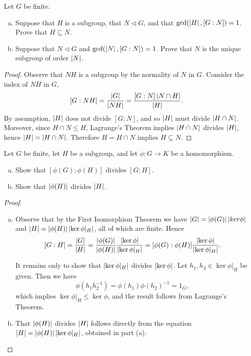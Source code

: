 \documentclass[10pt]{amsart}
\begin{document}
\begin{thm}
  Let $G$ be finite.
  \begin{enumerate}[(a)]
  \item
    Suppose that $H$ is a subgroup, that $N \lhd G$, and that $\gcd(\left| H \right|, [G:N]) = 1$.
    Prove that $H \subseteq N$.
  \item
    Suppose that $N \lhd G$ and $\gcd(\left| N \right|, [G:N]) = 1$.
    Prove that $N$ is the unique subgroup of order $\left| N \right|$.
  \end{enumerate}
  \begin{proof}
    Observe that $NH$ is a subgroup by the normality of $N$ in $G$.
    Consider the index of $NH$ in $G$, $$[G : NH] = \frac{\left| G \right|}{\left| NH \right|} = \frac{[G:N]\left| N \cap H \right|}{\left| H \right|}.$$
    By assumption, $\left| H \right|$ does not divide $[G:N]$, and so $\left| H \right|$ must divide $\left| H \cap N \right|$.
    Moreover, since $H \cap N \leq H$, Lagrange's Theorem implies $\left| H \cap N \right|$ divides $\left| H \right|$, hence $\left| H \right| = \left| H \cap N \right|$.
    Therefore $H = H \cap N$ implies $H \subseteq N$.
  \end{proof}
\end{thm}
\begin{thm}
  Let $G$ be finite, let $H$ be a subgroup, and let $\phi \colon G \rightarrow K$ be a homomorphism.
  \begin{enumerate}[(a)]
  \item
    Show that $[\phi(G) : \phi(H)]$ divides $[G : H]$.
  \item
    Show that $\left| \phi(H) \right|$ divides $\left| H \right|$.
  \end{enumerate}
  \begin{proof}
    \begin{enumerate}[(a)]
    \item
      Observe that by the First Isomorphism Theorem we have $\left| G \right| = \left| \phi(G) \right|\left| ker\phi \right|$ and $\left| H \right| = \left| \phi(H) \right|\left| \ker\phi|_H \right|$, all of which are finite.
      Hence $$[G : H] = \frac{\left| G \right|}{\left| H \right|} 
      = \frac{\left| \phi(G) \right|}{\left| \phi(H) \right|}\frac{\left| \ker\phi \right|}{\left| \ker\phi|_H \right|}
      = [\phi(G) : \phi(H)]\frac{\left| \ker\phi \right|}{\left| \ker\phi|_H \right|}.$$
      
      It remains only to show that $\left| \ker\phi|_H \right|$ divides $\left| \ker\phi \right|$.
      Let $h_1, h_2 \in \ker\phi|_H$ be given.
      Then we have 
      $$\phi(h_1h_2^{-1}) = \phi(h_1)\phi(h_2)^{-1} = 1_G,$$
      which implies $\ker\phi|_H \leq \ker\phi$, and the result follows from Lagrange's Theorem.  
    \item
      That $\left| \phi(H) \right|$ divides $\left| H \right|$ follows directly from the equation $\left| H \right| = \left| \phi(H) \right|\left| \ker\phi|_H \right|$, obtained in part (a).
    \end{enumerate}
  \end{proof}
\end{thm}
\end{document}
